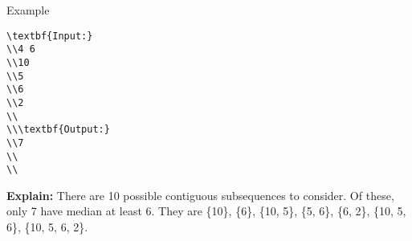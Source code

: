 Example
\begin{verbatim}
\textbf{Input:}
\\4 6 
\\10 
\\5 
\\6 
\\2 
\\
\\\textbf{Output:}
\\7 
\\
\\\end{verbatim}

\textbf{     Explain:    }    There are 10 possible contiguous subsequences to consider. Of these, only 7 have median at least 6. They are \{10\}, \{6\}, \{10, 5\}, \{5, 6\}, \{6, 2\}, \{10, 5, 6\}, \{10, 5, 6, 2\}.